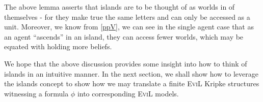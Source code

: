 The above lemma asserts that islands are to be thought of as worlds in
of themselves - for they make true the same letters and 
can only be accessed as a unit. Moreover, we know from \ref{ppV}, we
can see in the single agent case that as an agent ``ascends'' in an
island, they can access fewer worlds, which may be equated with
holding more beliefs.  



We hope that the above discussion provides some insight into how to
think of islands in an intuitive manner.  In the next section,
we shall show how to leverage the islands concept to show
how we may translate a finite \textsc{EviL} Kripke structures
witnessing a formula $\phi$ into corresponding \textsc{EviL} models.



